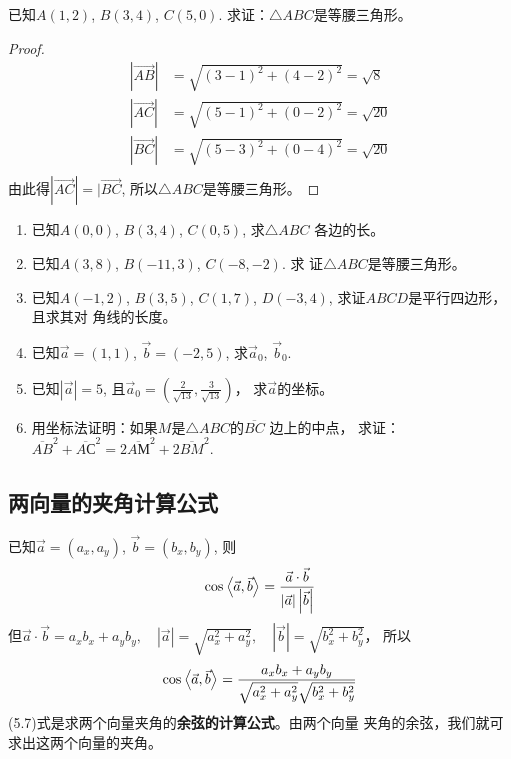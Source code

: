 \begin{example}
    已知$A(1,2)$, $B(3,4)$, $C(5,0)$. 求证：$\triangle ABC$是等腰三角形。
\end{example}

\begin{proof}
\[\begin{split}
|\Vec{AB}|&=\sqrt{(3-1)^2+(4-2)^2}=\sqrt{8}\\
|\Vec{AC}|&=\sqrt{(5-1)^2+(0-2)^2}=\sqrt{20}\\
|\Vec{BC}|&=\sqrt{(5-3)^2+(0-4)^2}=\sqrt{20}\\
\end{split}\]
由此得$|\Vec{AC}|=|\Vec{BC}$, 所以$\triangle ABC$是等腰三角形。
\end{proof}

\begin{ex}
\begin{enumerate}
    \item 已知$A(0,0)$, $B(3,4)$, $C(0,5)$, 求$\triangle ABC$
    各边的长。
    \item 已知$A(3,8)$, $B(-11,3)$, $C(-8,-2)$. 求
    证$\triangle ABC$是等腰三角形。
    \item 已知$A(-1,2)$, $B(3,5)$, $C(1,7)$, 
    $D(-3,4)$, 求证$ABCD$是平行四边形，且求其对
    角线的长度。
    \item 已知$\vec{a}=(1,1)$, $\vec{b}=(-2,5)$, 求$\vec{a}_0$, $\vec{b}_0$.
    \item 已知$|\vec{a}|=5$, 且$\vec{a}_0=\left(\frac{2}{\sqrt{13}},\frac{3}{\sqrt{13}}\right)$，
    求$\vec{a}$的坐标。
    \item 用坐标法证明：如果$M$是$\triangle ABC$的$\overline{BC}$
    边上的中点，
    求证：$\overline{AB}^2+\overline{AС}^2=2\overline{AМ}^2+2\overline{BM}^2$.
\end{enumerate}
\end{ex}

\subsection{两向量的夹角计算公式}

已知$\vec{a}=(a_x,a_y)$, $\vec{b}=(b_x,b_y)$, 则
\[\cos\left\langle \vec{a},\vec{b} \right\rangle=\dfrac{\vec{a}\cdot \vec{b}}{|\vec{a}|\left|\vec{b}\right|}\]
但$\vec{a}\cdot \vec{b}=a_xb_x+a_yb_y,\quad |\vec{a}|=\sqrt{a_x^2+a_y^2},\quad \left|\vec{b}\right|=\sqrt{b_x^2+b_y^2}$，
所以
\begin{equation}
    \cos\left\langle \vec{a},\vec{b} \right\rangle=\dfrac{a_xb_x+a_yb_y}{\sqrt{a_x^2+a_y^2}\sqrt{b_x^2+b_y^2}}
\end{equation}
(5.7)式是求两个向量夹角的\textbf{余弦的计算公式}。由两个向量
夹角的余弦，我们就可求出这两个向量的夹角。

